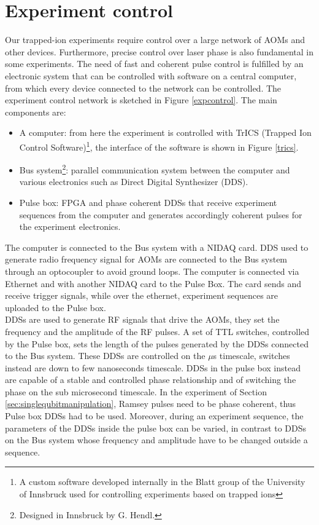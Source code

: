 \section{Experiment control}
\label{sec:expcontrol}
Our trapped-ion experiments require control over a large network of AOMs and other devices. Furthermore, precise control over laser phase is also fundamental in some experiments. The need of fast and coherent pulse control is fulfilled by an electronic system that can be controlled with software on a central computer, from which every device connected to the network can be controlled. The experiment control network is sketched in Figure \ref{expcontrol}. The main components are:
\begin{itemize}
\item A computer: from here the experiment is controlled with TrICS (Trapped Ion Control Software)\footnote{A custom software developed internally in the Blatt  group of the University of Innsbruck used for controlling experiments based on trapped ions}, the interface of the software is shown in Figure \ref{trics}.
\item Bus system\footnote{Designed in Innsbruck by G. Hendl.}: parallel communication system between the computer and various electronics such as Direct Digital Synthesizer (DDS).
\item Pulse box: FPGA and phase coherent DDSs that receive experiment sequences from the computer and generates accordingly coherent pulses for the experiment electronics.
\end{itemize}
The computer is connected to the Bus system with a NIDAQ card. DDS used to generate radio frequency signal for AOMs are connected to the Bus system through an optocoupler to avoid ground loops. The computer is connected via Ethernet and with another NIDAQ card to the Pulse Box. The card sends and receive trigger signals, while over the ethernet, experiment sequences are uploaded to the Pulse box.\\
DDSs are used to generate RF signals that drive the AOMs, they set the frequency and the amplitude of the RF pulses. A set of TTL switches, controlled by the Pulse box, sets the length of the pulses generated by the DDSs connected to the Bus system. These DDSs are controlled on the $\mu$s timescale, switches instead are down to few nanoseconds timescale. DDSs in the pulse box instead are capable of a stable and controlled phase relationship and of switching the phase on the sub microsecond timescale. In the experiment of Section \ref{sec:singlequbitmanipulation}, Ramsey pulses need to be phase coherent, thus Pulse box DDSs had to be used. Moreover, during an experiment sequence, the parameters of the DDSs inside the pulse box can be varied, in contrast to DDSs on the Bus system whose frequency and amplitude have to be changed outside a sequence.\\
